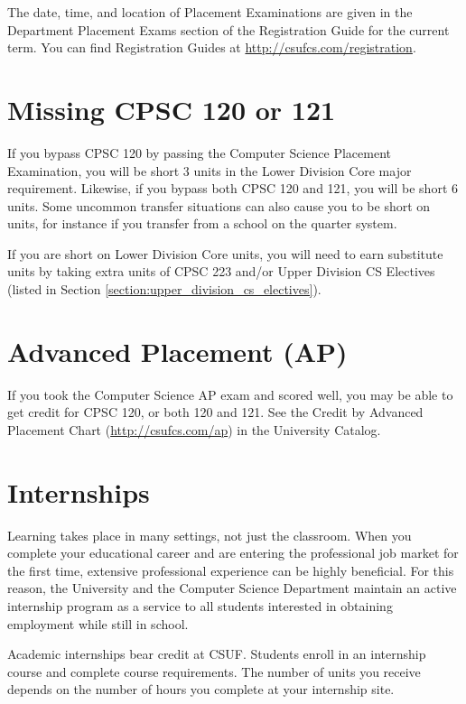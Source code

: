 \documentclass{book}
\newcommand{\CampusName}{CSUF}
\newcommand{\shrunkurl}[1]{\url{http://csufcs.com/#1}}
\begin{document}
The date, time, and location of Placement Examinations are given in
the Department Placement Exams section of the Registration Guide for
the current term. You can find Registration Guides at
\shrunkurl{registration}.

\section{Missing CPSC 120 or 121}

If you bypass CPSC 120 by passing the Computer Science Placement
Examination, you will be short 3 units in the Lower Division Core
major requirement. Likewise, if you bypass both CPSC 120 and 121, you
will be short 6 units. Some uncommon transfer situations can also
cause you to be short on units, for instance if you transfer from a
school on the quarter system.

If you are short on Lower Division Core units, you will need to earn
substitute units by taking extra units of CPSC 223 and/or Upper
Division CS Electives (listed in Section
\ref{section:upper_division_cs_electives}).


\section{Advanced Placement (AP)}
\label{section:ap}
 If you took the Computer Science AP
exam and scored well, you may be able to get credit for CPSC 120, or
both 120 and 121. See the Credit by Advanced Placement Chart
(\shrunkurl{ap}) in the University Catalog.

\section{Internships}

Learning takes place in many settings, not just the classroom. When
you complete your educational career and are entering the professional
job market for the first time, extensive professional experience can
be highly beneficial. For this reason, the University and the Computer
Science Department maintain an active internship program as a service
to all students interested in obtaining employment while still in
school.

Academic internships bear credit at \CampusName. Students enroll in an
internship course and complete course requirements. The number of
units you receive depends on the number of hours you complete at your
internship site.
\end{document}
